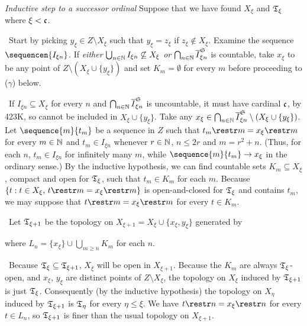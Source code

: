 {\medskip

 {\it Inductive step to a successor ordinal} Suppose that
we have found $X_{\xi}$ and $\frak T_{\xi}$ where $\xi<\frak c$.

\medskip

\qquad\grheada\ Start by picking $y_{\xi}\in Z\setminus X_{\xi}$ such
that $y_{\xi}=z_{\xi}$ if $z_{\xi}\notin X_{\xi}$.
Examine the sequence $\sequencen{I_{\xi n}}$.   If {\it either}
$\bigcup_{n\in\Bbb N}I_{\xi n}\not\subseteq X_{\xi}$ {\it or}
$\bigcap_{n\in\Bbb N}\overline{I}_{\xi n}^{\frak S}$ is countable, take
$x_{\xi}$ to be any point of $Z\setminus(X_{\xi}\cup\{y_{\xi}\})$
and set $K_m=\emptyset$ for every $m$ before proceeding to ($\gamma$)
below.

\medskip

\qquad\grheadb\ If $I_{\xi n}\subseteq X_{\xi}$ for every $n$ and
$\bigcap_{n\in\Bbb N}\overline{I}_{\xi n}^{\frak S}$ is uncountable, it
must have cardinal $\frak c$, by 423K, so cannot be included in
$X_{\xi}\cup\{y_{\xi}\}$.    Take any
$x_{\xi}\in\bigcap_{n\in\Bbb N}\overline{I}_{\xi n}^{\frak S}
\setminus(X_{\xi}\cup\{y_{\xi}\})$.   Let $\sequence{m}{t_m}$ be a
sequence in $Z$ such that $t_m\restr m=x_{\xi}\restr m$ for every
$m\in\Bbb N$ and $t_m\in I_{\xi n}$ whenever $r\in\Bbb N$, $n\le 2r$ and
$m=r^2+n$.   (Thus, for each $n$, $t_m\in I_{\xi n}$ for infinitely many
$m$, while $\sequence{m}{t_m}\to x_{\xi}$ in the ordinary sense.)   By
the inductive hypothesis, we can find countable sets
$K_m\subseteq X_{\xi}$,
compact and open for $\frak T_{\xi}$, such that $t_m\in K_m$ for each
$m$.   Because $\{t:t\in X_{\xi},\,t\restr m=x_{\xi}\restr m\}$ is
open-and-closed for $\frak T_{\xi}$ and contains $t_m$, we may suppose
that $t\restr m=x_{\xi}\restr m$ for every $t\in K_m$.

\medskip

\qquad\grheadc\ Let $\frak T_{\xi+1}$ be the topology on
$X_{\xi+1}=X_{\xi}\cup\{x_{\xi},y_{\xi}\}$ generated by


\noindent where $L_n=\{x_{\xi}\}\cup\bigcup_{m\ge n}K_m$ for each $n$.

\medskip

\qquad\grheadd\ Because $\frak T_{\xi}\subseteq\frak T_{\xi+1}$,
$X_{\xi}$ will be open in $X_{\xi+1}$.   Because the $K_m$ are always
$\frak T_{\xi}$-open, and $x_{\xi}$, $y_{\xi}$ are distinct points of
$Z\setminus X_{\xi}$, the topology on $X_{\xi}$ induced by
$\frak T_{\xi+1}$ is just $\frak T_{\xi}$.   Consequently (by the
inductive
hypothesis) the topology on $X_{\eta}$ induced by $\frak T_{\xi+1}$ is
$\frak T_{\eta}$ for every $\eta\le\xi$.   We have
$t\restr n=x_{\xi}\restr n$ for every $t\in L_n$, so $\frak T_{\xi+1}$
is finer than the usual topology on $X_{\xi+1}$.

}
